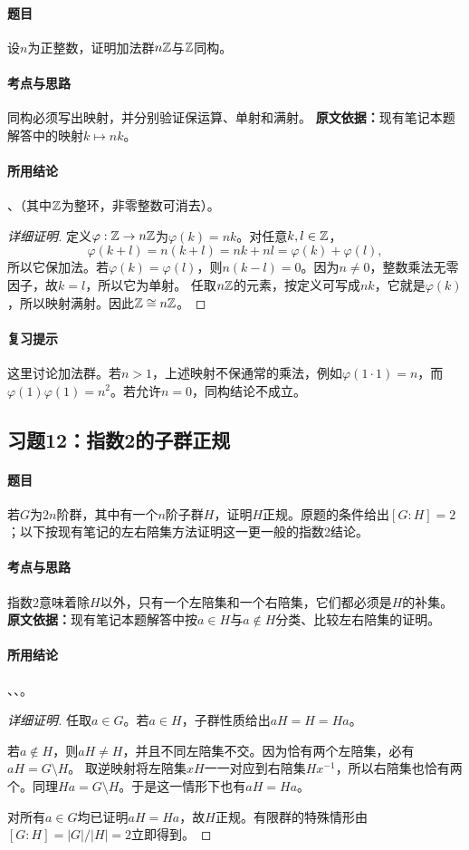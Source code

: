 \paragraph{题目}
设$n$为正整数，证明加法群$n\mathbb Z$与$\mathbb Z$同构。
\paragraph{考点与思路}
同构必须写出映射，并分别验证保运算、单射和满射。
\textbf{原文依据：}现有笔记本题解答中的映射$k\mapsto nk$。
\paragraph{所用结论}
、（其中$\mathbb Z$为整环，非零整数可消去）。
\begin{proof}[详细证明]
定义$\varphi:\mathbb Z\to n\mathbb Z$为$\varphi(k)=nk$。对任意$k,l\in\mathbb Z$，
\[
\varphi(k+l)=n(k+l)=nk+nl=\varphi(k)+\varphi(l),
\]
所以它保加法。若$\varphi(k)=\varphi(l)$，则$n(k-l)=0$。因为$n\ne0$，整数乘法无零因子，故$k=l$，所以它为单射。
任取$n\mathbb Z$的元素，按定义可写成$nk$，它就是$\varphi(k)$，所以映射满射。因此$\mathbb Z\cong n\mathbb Z$。
\end{proof}
\paragraph{复习提示}
这里讨论加法群。若$n>1$，上述映射不保通常的乘法，例如$\varphi(1\cdot1)=n$，而$\varphi(1)\varphi(1)=n^2$。若允许$n=0$，同构结论不成立。

\subsection{习题12：指数2的子群正规}
\paragraph{题目}
若$G$为$2n$阶群，其中有一个$n$阶子群$H$，证明$H$正规。原题的条件给出$[G:H]=2$；以下按现有笔记的左右陪集方法证明这一更一般的指数2结论。
\paragraph{考点与思路}
指数2意味着除$H$以外，只有一个左陪集和一个右陪集，它们都必须是$H$的补集。
\textbf{原文依据：}现有笔记本题解答中按$a\in H$与$a\notin H$分类、比较左右陪集的证明。
\paragraph{所用结论}
、、。
\begin{proof}[详细证明]
任取$a\in G$。若$a\in H$，子群性质给出$aH=H=Ha$。

若$a\notin H$，则$aH\ne H$，并且不同左陪集不交。因为恰有两个左陪集，必有$aH=G\setminus H$。
取逆映射将左陪集$xH$一一对应到右陪集$Hx^{-1}$，所以右陪集也恰有两个。同理$Ha=G\setminus H$。于是这一情形下也有$aH=Ha$。

对所有$a\in G$均已证明$aH=Ha$，故$H$正规。有限群的特殊情形由$[G:H]=|G|/|H|=2$立即得到。
\end{proof}
